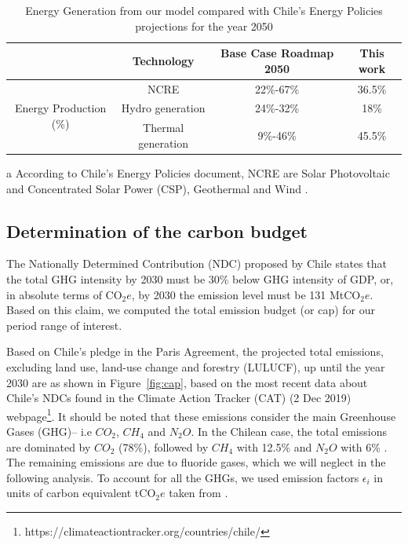 \documentclass[11pt, letterpaper]{article}
\begin{document}
\begin{table}[!htbp]
\centering
  \begin{threeparttable}[t]
       \begin{tabular}{ c c c c } 
\hline
 & Technology & Base Case Roadmap 2050 & This work \\
\hline
\multirow{4}{8em}{Energy Production (\%)} & NCRE\tnote{a} & 22\%-67\% & 36.5\% \\ 
 & Hydro generation & 24\%-32\% & 18\% \\ 
& Thermal generation & 9\%-46\% & 45.5\% \\
\hline
\end{tabular}
     \begin{tablenotes}
     \footnotesize{
     \item[a] According to Chile's Energy Policies document, NCRE are Solar Photovoltaic and Concentrated Solar Power (CSP), Geothermal and Wind .
     }
   \end{tablenotes}
    \end{threeparttable}%
    \caption{Energy Generation from our model compared with Chile's Energy Policies projections for the year 2050}
  \label{tab:bc_comp}%
\end{table}%



\subsection{Determination of the carbon budget}\label{sec:cap}

The Nationally Determined Contribution (NDC) proposed by Chile states that the total GHG intensity by 2030 must be 30\% below GHG intensity of GDP, or, in absolute terms of CO$_2e$, by 2030 the emission level must be 131 MtCO$_2e$. Based on this claim, we computed the total emission budget (or cap) for our period range of interest. 
\smallskip

Based on Chile's pledge in the Paris Agreement, the projected total emissions, excluding land use, land-use change and  forestry (LULUCF), up until the year 2030 are as shown in Figure~\ref{fig:cap}, based on the most recent data about Chile's NDCs found in the Climate Action Tracker (CAT) (2 Dec 2019) webpage\footnote{https://climateactiontracker.org/countries/chile/}. It should be noted that these emissions consider the main Greenhouse Gases (GHG)-- i.e $CO_2$, $CH_4$ and $N_2O$.  In the Chilean case, the total emissions are dominated by $CO_2$ (78\%), followed by $CH_4$ with 12.5\% and $N_2O$  with 6\% \cite{ChileInformeBienal2016}. The remaining emissions are due to fluoride gases, which we will neglect in the following analysis. To account for all the GHGs, we used emission factors $\epsilon_i$ in units of carbon equivalent tCO$_2e$ taken from \cite{IPCC2014}.
\end{document}
